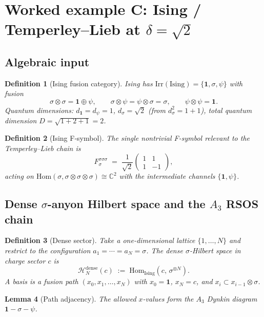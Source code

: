 \documentclass[11pt,a4paper]{article}
\newtheorem{definition}{Definition}[section]
\newtheorem{lemma}[definition]{Lemma}
\theoremstyle{definition}
\newcommand{\Hh}{\mathcal{H}}
\newcommand{\Irr}{\mathrm{Irr}}
\newcommand{\Hom}{\mathrm{Hom}}
\newcommand{\Ising}{\mathrm{Ising}}
\newcommand{\one}{\mathbf{1}}
\begin{document}
\section{Worked example C: Ising / Temperley--Lieb at $\delta=\sqrt 2$}\label{sec:ising-data}

\subsection{Algebraic input}

\begin{definition}[Ising fusion category]\label{def:ising}
Ising has $\Irr(\Ising) = \{\one, \sigma, \psi\}$ with fusion
\[
\sigma\otimes\sigma = \one\oplus\psi, \qquad
\sigma\otimes\psi = \psi\otimes\sigma = \sigma, \qquad
\psi\otimes\psi = \one.
\]
Quantum dimensions: $d_\one=d_\psi=1$, $d_\sigma=\sqrt 2$ (from $d_\sigma^{2} = 1+1$),
total quantum dimension $D = \sqrt{1+2+1} = 2$.
\end{definition}

\begin{definition}[Ising F-symbol]\label{def:ising-F}
The single nontrivial F-symbol relevant to the Temperley--Lieb chain is
\[
F^{\sigma\sigma\sigma}_{\sigma}
\;=\;
\frac{1}{\sqrt 2}\begin{pmatrix} 1 & 1\\ 1 & -1\end{pmatrix},
\]
acting on $\Hom(\sigma,\sigma\otimes\sigma\otimes\sigma)\cong\mathbb{C}^{2}$ with the
intermediate channels $\{\one,\psi\}$.
\end{definition}

\subsection{Dense $\sigma$-anyon Hilbert space and the $A_3$ RSOS chain}

\begin{definition}[Dense sector]\label{def:dense}
Take a one-dimensional lattice $\{1,\dots,N\}$ and restrict to the
configuration $a_1=\cdots=a_N=\sigma$. The \emph{dense $\sigma$-Hilbert
space in charge sector $c$} is
\[
\Hh_N^{\mathrm{dense}}(c) \;:=\; \Hom_{\Ising}(c,\,\sigma^{\otimes N}).
\]
A basis is a \emph{fusion path} $(x_0,x_1,\dots,x_N)$ with $x_0=\one$,
$x_N=c$, and $x_i\subset x_{i-1}\otimes\sigma$.
\end{definition}

\begin{lemma}[Path adjacency]\label{lem:path-adj}
The allowed $x$-values form the $A_3$ Dynkin diagram $\one - \sigma - \psi$.
\end{lemma}
\end{document}
